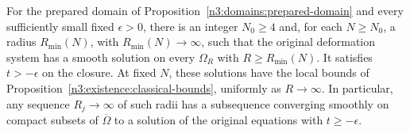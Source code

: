 \begin{theorem}
\label{n3:existence:deformation}
For the prepared domain of Proposition~\ref{n3:domains:prepared-domain}
and every sufficiently small fixed $\epsilon>0$, there is an
integer $N_0\ge4$ and, for each $N\ge N_0$, a radius
$R_{\min}(N)$, with $R_{\min}(N)\to\infty$, such that the original
deformation system has a smooth solution on every $\Omega_R$ with
$R\ge R_{\min}(N)$.  It satisfies $t>-\epsilon$ on the closure.
At fixed $N$, these solutions have the local bounds of
Proposition~\ref{n3:existence:classical-bounds}, uniformly as
$R\to\infty$.  In particular, any sequence $R_j\to\infty$ of such radii has a
subsequence converging smoothly on compact subsets of
$\overline\Omega$ to a solution of the original equations with
$t\ge-\epsilon$.
\end{theorem}

